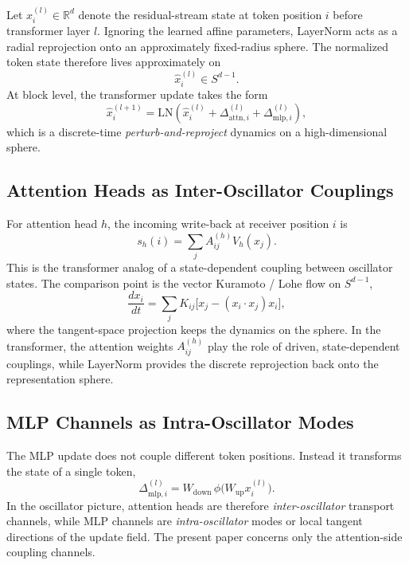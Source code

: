 \documentclass[aps,prd,onecolumn,superscriptaddress,showpacs,12pt]{revtex4-2}
\begin{document}
Let $x_i^{(l)} \in \mathbb{R}^d$ denote the residual-stream state at token
position $i$ before transformer layer $l$. Ignoring the learned affine parameters,
LayerNorm acts as a radial reprojection onto an approximately fixed-radius sphere.
The normalized token state therefore lives approximately on
\begin{equation}
\hat{x}_i^{(l)} \in S^{d-1}.
\end{equation}
At block level, the transformer update takes the form
\begin{equation}
\hat{x}_i^{(l+1)} = \mathrm{LN}\!\left(\hat{x}_i^{(l)} + \Delta_{\mathrm{attn},i}^{(l)} + \Delta_{\mathrm{mlp},i}^{(l)}\right),
\end{equation}
which is a discrete-time \emph{perturb-and-reproject} dynamics on a high-dimensional
sphere.

\subsection{Attention Heads as Inter-Oscillator Couplings}

For attention head $h$, the incoming write-back at receiver position $i$ is
\begin{equation}
s_h(i) = \sum_j A_{ij}^{(h)} V_h(x_j).
\end{equation}
This is the transformer analog of a state-dependent coupling between oscillator
states. The comparison point is the vector Kuramoto / Lohe flow on $S^{d-1}$,
\begin{equation}
\frac{d x_i}{dt} = \sum_j K_{ij}\bigl[x_j - (x_i \cdot x_j)x_i\bigr],
\end{equation}
where the tangent-space projection keeps the dynamics on the sphere. In the
transformer, the attention weights $A_{ij}^{(h)}$ play the role of driven,
state-dependent couplings, while LayerNorm provides the discrete reprojection
back onto the representation sphere.

\subsection{MLP Channels as Intra-Oscillator Modes}
\label{sec:mlp-modes}

The MLP update does not couple different token positions. Instead it transforms the
state of a single token,
\begin{equation}
\Delta_{\mathrm{mlp},i}^{(l)} = W_{\mathrm{down}} \,\phi\!\bigl(W_{\mathrm{up}} x_i^{(l)}\bigr).
\end{equation}
In the oscillator picture, attention heads are therefore \emph{inter-oscillator}
transport channels, while MLP channels are \emph{intra-oscillator} modes or local
tangent directions of the update field. The present paper concerns only the
attention-side coupling channels.
\end{document}
